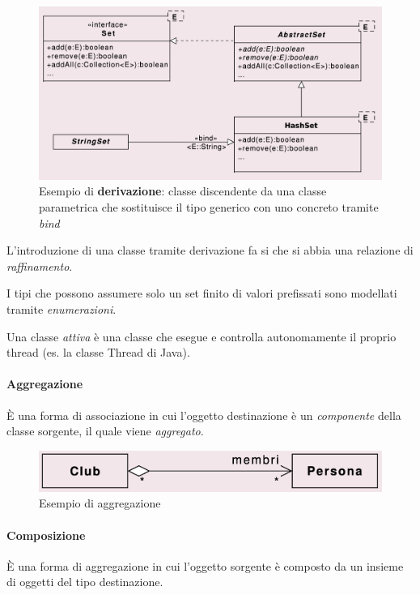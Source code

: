 \begin{figure}[h!]
    \centering
    \includegraphics[width=1\linewidth]{assets/UML/class/class-11.png}
    \caption{Esempio di \textbf{derivazione}: classe discendente da una classe parametrica che sostituisce il tipo generico con uno concreto tramite \textit{bind}}
    
\end{figure}
L'introduzione di una classe tramite derivazione fa si che si abbia una relazione di \textit{raffinamento}. 

I tipi che possono assumere solo un set finito di valori prefissati sono modellati tramite \textit{enumerazioni}. 

Una classe \textit{attiva} è una classe che esegue e controlla autonomamente il proprio thread (es. la classe Thread di Java).

\paragraph{Aggregazione} È una forma di associazione in cui l'oggetto destinazione è un \textit{componente} della classe sorgente, il quale viene \textit{aggregato}.

\begin{figure}[h!]
    \centering
    \includegraphics[width=1\linewidth]{assets/UML/class/class-6.png}
    \caption{Esempio di aggregazione}
\end{figure}

\paragraph{Composizione} È una forma di aggregazione in cui l'oggetto sorgente è composto da un insieme di oggetti del tipo destinazione.

